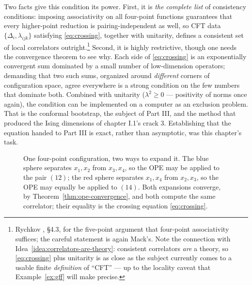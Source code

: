 Two facts give this condition its power. First, it is \emph{the complete
list} of consistency conditions: imposing associativity on
all four-point functions guarantees that every higher-point reduction is
pairing-independent as well, so CFT data $\{\Delta_i, \lambda_{ijk}\}$
satisfying \eqref{eq:crossing}, together with unitarity, defines a
consistent set of
local correlators outright.\footnote{Rychkov , \S4.3, for
the five-point argument that four-point associativity suffices; the careful
statement is again Mack's. Note the connection with
Idea~\ref{idea:correlators-are-theory}: consistent correlators \emph{are} a
theory, so \eqref{eq:crossing} plus unitarity is as close as the subject
currently comes to a usable finite \emph{definition} of ``CFT'' --- up to
the locality caveat that Example~\ref{ex:gff} will make precise.}
Second, it is highly restrictive, though one needs the convergence
theorem to see why. Each side of \eqref{eq:crossing} is an exponentially
convergent sum dominated by a small number of low-dimension operators;
demanding
that two such sums, organized around \emph{different} corners of
configuration space, agree everywhere is a strong condition on the
few numbers that dominate both. Combined with unitarity ($\lambda^2 \ge 0$
--- positivity of norms once again), the condition can be implemented on a
computer as an exclusion problem. That is the conformal bootstrap, the
subject of Part III, and the method that produced the Ising dimensions of
chapter I.1's crack 3. Establishing that the equation handed to Part III is
exact, rather than asymptotic, was this chapter's task.

\begin{figure}[t]
\centering
{}
\caption{One four-point configuration, two ways to expand it. The blue
  sphere separates $x_1, x_2$ from $x_3, x_4$, so the OPE may be applied to
  the pair $(12)$; the red sphere separates $x_1, x_4$ from $x_2, x_3$, so
  the OPE may equally be applied to $(14)$. Both expansions converge, by
  Theorem~\ref{thm:ope-convergence}, and both compute the same correlator;
  their equality is the crossing equation \eqref{eq:crossing}.}
\label{fig:crossing}
\end{figure}

